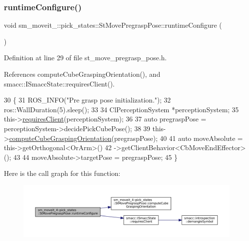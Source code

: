 \subsubsection{\texorpdfstring{runtime\+Configure()}{runtimeConfigure()}}
{\footnotesize\ttfamily void sm\+\_\+moveit\+\_\+::pick\+\_\+states\+::\+St\+Move\+Pregrasp\+Pose\+::runtime\+Configure (\begin{DoxyParamCaption}{ }\end{DoxyParamCaption})\hspace{0.3cm}{\ttfamily [inline]}}



Definition at line 29 of file st\+\_\+move\+\_\+pregrasp\+\_\+pose.\+h.



References compute\+Cube\+Grasping\+Orientation(), and smacc\+::\+I\+Smacc\+State\+::requires\+Client().


\begin{DoxyCode}
30     \{
31         ROS\_INFO(\textcolor{stringliteral}{"Pre grasp pose initialization."});
32         ros::WallDuration(5).sleep();
33 
34         ClPerceptionSystem *perceptionSystem;
35         this->\hyperlink{classsmacc_1_1ISmaccState_a7f95c9f0a6ea2d6f18d1aec0519de4ac}{requiresClient}(perceptionSystem);
36         
37         \textcolor{keyword}{auto} pregraspPose = perceptionSystem->decidePickCubePose();
38 
39         this->\hyperlink{structsm__moveit__4_1_1pick__states_1_1StMovePregraspPose_a30f404d06b8bcf9b5866d713a297012b}{computeCubeGraspingOrientation}(pregraspPose);
40 
41         \textcolor{keyword}{auto} moveAbsolute = this->getOrthogonal<OrArm>()
42                                 ->getClientBehavior<CbMoveEndEffector>();
43 
44         moveAbsolute->targetPose = pregraspPose;
45     \}
\end{DoxyCode}
Here is the call graph for this function\+:
\nopagebreak
\begin{figure}[H]
\begin{center}
\leavevmode
\includegraphics[width=350pt]{structsm__moveit__4_1_1pick__states_1_1StMovePregraspPose_ae9ffdf77d89169b5f4fb2cb2fadd56fc_cgraph}
\end{center}
\end{figure}
\mbox{\label{structsm__moveit__4_1_1pick__states_1_1StMovePregraspPose_afb6abd382c1c9f35dd5f74967301cc48}} 
